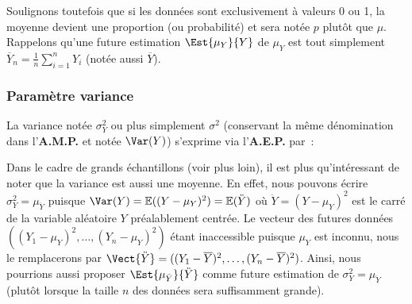 \documentclass[10pt]{article}
\begin{document}
Soulignons toutefois que si les donn{\'e}es sont exclusivement {\`a} valeurs 0 ou 1, la moyenne devient une proportion (ou probabilit{\'e}) et sera not{\'e}e $p$ plut{\^o}t que $\mu$. Rappelons qu'une future estimation $\Est{\mu_Y}{Y}$ de $\mu_Y$ est tout simplement $\overline{Y}_n=\displaystyle{\frac 1n\sum_{i=1}^nY_i}$ (not{\'e}e aussi $\overline{Y}$). 
\subsubsection{Paramètre variance}
La variance not{\'e}e $\sigma^2_Y$ ou plus simplement $\sigma^2$ (conservant la m{\^e}me d{\'e}nomination dans l'\textbf{A.M.P.} et not{\'e}e $\Var(Y)$) s'exprime via l'\textbf{A.E.P.} par~:\\ 
\centerline{}

Dans le cadre de grands {\'e}chantillons (voir plus loin), il est plus qu'int{\'e}ressant de  noter que la variance est aussi une moyenne. En effet, nous pouvons {\'e}crire 
$\sigma^2_Y=\mu_{\ddot{Y}}$ puisque $\Var(Y)=\mathbb{E}((Y-\mu_Y)^2)=\mathbb{E}(\ddot{Y}) $ o{\`u} $\ddot{Y}=(Y-\mu_Y)^2$ est le carr{\'e} de la variable al{\'e}atoire $Y$ pr{\'e}alablement centr{\'e}e. 
Le vecteur des futures donn{\'e}es  $((Y_1-\mu_Y)^2,\ldots,(Y_n-\mu_Y)^2)$ {\'e}tant inaccessible puisque $\mu_Y$ est inconnu, nous le remplacerons par $\Vect{\ddot{Y}}=((Y_1-\overline{Y})^2,\ldots,(Y_n-\overline{Y})^2 )$. Ainsi, nous pourrions aussi proposer $\Est{\mu_{\ddot{Y}}}{\ddot{Y}}$ comme future estimation de $\sigma^2_Y=\mu_{\ddot{Y}}$ (plut{\^o}t lorsque la taille $n$ des donn{\'e}es sera suffisamment grande).\\
\end{document}
